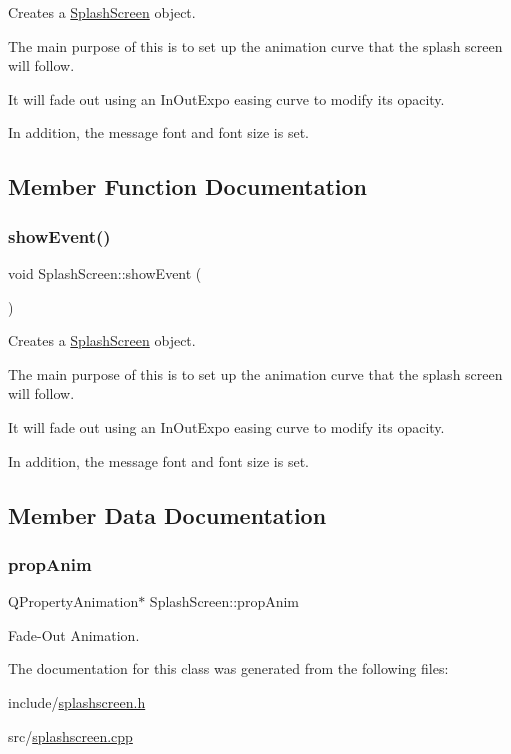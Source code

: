 Creates a \mbox{\hyperlink{classSplashScreen}{Splash\+Screen}} object.

The main purpose of this is to set up the animation curve that the splash screen will follow.

It will fade out using an In\+Out\+Expo easing curve to modify its opacity.

In addition, the message font and font size is set. 

\subsection{Member Function Documentation}
\mbox{\label{classSplashScreen_a1fb8a268c53bc5de2ba37df68cc237cc}} 
\subsubsection{\texorpdfstring{showEvent()}{showEvent()}}
{\footnotesize\ttfamily void Splash\+Screen\+::show\+Event (\begin{DoxyParamCaption}\item[{Q\+Show\+Event $\ast$}]{ }\end{DoxyParamCaption})}

Creates a \mbox{\hyperlink{classSplashScreen}{Splash\+Screen}} object.

The main purpose of this is to set up the animation curve that the splash screen will follow.

It will fade out using an In\+Out\+Expo easing curve to modify its opacity.

In addition, the message font and font size is set. 

\subsection{Member Data Documentation}
\mbox{\label{classSplashScreen_ad24181386e6732f6ce5d69e5ddc16cd9}} 
\subsubsection{\texorpdfstring{propAnim}{propAnim}}
{\footnotesize\ttfamily Q\+Property\+Animation$\ast$ Splash\+Screen\+::prop\+Anim\hspace{0.3cm}{\ttfamily [private]}}



Fade-\/\+Out Animation. 



The documentation for this class was generated from the following files\+:\begin{DoxyCompactItemize}
\item 
include/\mbox{\hyperlink{splashscreen_8h}{splashscreen.\+h}}\item 
src/\mbox{\hyperlink{splashscreen_8cpp}{splashscreen.\+cpp}}\end{DoxyCompactItemize}
